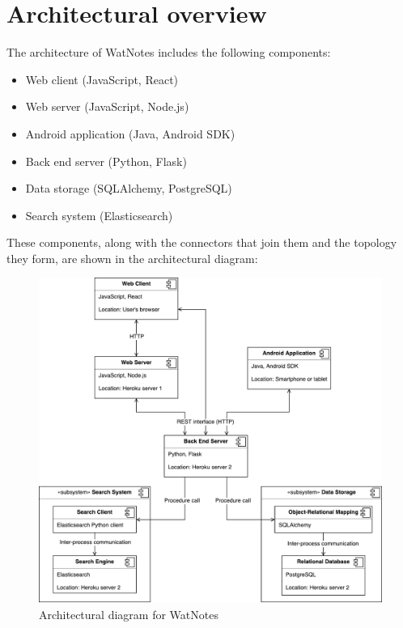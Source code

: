 \documentclass[12pt]{article}
\begin{document}
\section{Architectural overview}
The architecture of WatNotes includes the following components:
\begin{itemize}
\setlength\itemsep{0pt}
  \item Web client (JavaScript, React)
  \item Web server (JavaScript, Node.js)
  \item Android application (Java, Android SDK)
  \item Back end server (Python, Flask)
  \item Data storage (SQLAlchemy, PostgreSQL)
  \item Search system (Elasticsearch)
\end{itemize}
These components, along with the connectors that join them and the topology they form, are shown in the architectural diagram:
\begin{figure}[H]
  \centering
  \includegraphics[width=0.9\linewidth]{diagram.pdf}
  \caption{Architectural diagram for WatNotes}
\end{figure}
\end{document}
